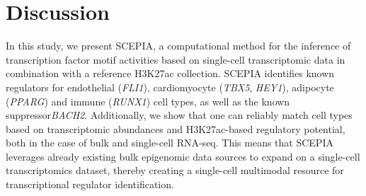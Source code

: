 \section{Discussion}

In this study, we present SCEPIA, a computational method for the inference of transcription factor motif activities based on single-cell transcriptomic data in combination with a reference H3K27ac collection. SCEPIA identifies known regulators for endothelial (\textit{FLI1}), cardiomyocyte (\textit{TBX5}, \textit{HEY1}), adipocyte (\textit{PPARG}) and immune (\textit{RUNX1}) cell types, as well as the known suppressor\textit{BACH2}. Additionally, we show that one can reliably match cell types based on transcriptomic abundances and H3K27ac-based regulatory potential\cite{Wang2016}, both in the case of bulk and single-cell RNA-seq. This means that SCEPIA leverages already existing bulk epigenomic data sources to expand on a single-cell transcriptomics dataset, thereby creating a single-cell multimodal resource for transcriptional regulator identification.

